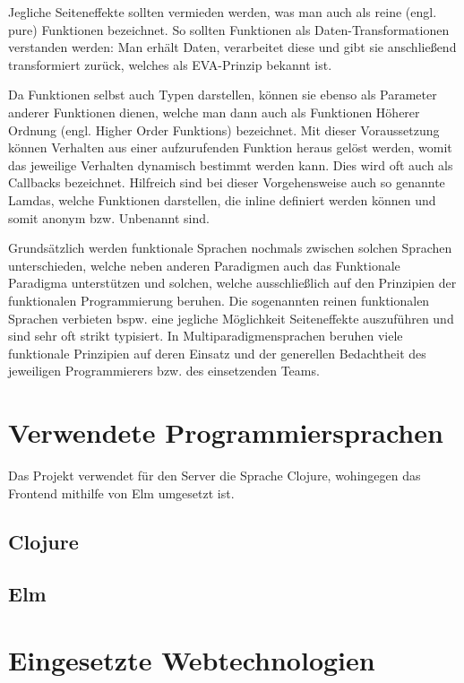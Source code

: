 Jegliche Seiteneffekte sollten vermieden werden, was man auch als reine (engl. pure) Funktionen bezeichnet.
So sollten Funktionen als Daten-Transformationen verstanden werden: Man erhält Daten, verarbeitet diese und gibt sie anschließend transformiert zurück, welches als \ac{EVA}-Prinzip bekannt ist.
\par
Da Funktionen selbst auch Typen darstellen, können sie ebenso als Parameter anderer Funktionen dienen, welche man dann auch als Funktionen Höherer Ordnung (engl. Higher Order Funktions) bezeichnet.
Mit dieser Voraussetzung können Verhalten aus einer aufzurufenden Funktion heraus gelöst werden, womit das jeweilige Verhalten dynamisch bestimmt werden kann.
Dies wird oft auch als Callbacks bezeichnet.
Hilfreich sind bei dieser Vorgehensweise auch so genannte Lamdas, welche Funktionen darstellen, die inline definiert werden können und somit anonym \ac{bzw.} Unbenannt sind.
\par
Grundsätzlich werden funktionale Sprachen nochmals zwischen solchen Sprachen unterschieden, welche neben anderen Paradigmen auch das Funktionale Paradigma unterstützen und solchen, welche ausschließlich auf den Prinzipien der funktionalen Programmierung beruhen.
Die sogenannten reinen funktionalen Sprachen verbieten \ac{bspw.} eine jegliche Möglichkeit Seiteneffekte auszuführen und sind sehr oft strikt typisiert.
In Multiparadigmensprachen beruhen viele funktionale Prinzipien auf deren Einsatz und der generellen Bedachtheit des jeweiligen Programmierers \ac{bzw.} des einsetzenden Teams.

\section{Verwendete Programmiersprachen}
Das Projekt verwendet für den Server die Sprache Clojure, wohingegen das Frontend mithilfe von Elm umgesetzt ist.
\subsection{Clojure}
\blindtext
\par
\blindtext
\subsection{Elm}
\blindtext
\par
\blindtext
\section{Eingesetzte Webtechnologien}
